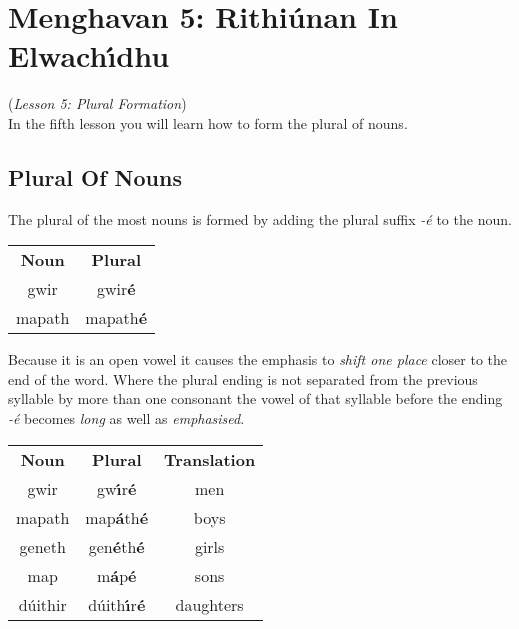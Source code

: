 \section{Menghavan 5: Rithi\'{u}nan In Elwach\'{\i}dhu}
(\textit{Lesson 5: Plural Formation})\\

In the fifth lesson you will learn how to form the plural of nouns.\\

\subsection{Plural Of Nouns}

The plural of the most nouns is formed by adding the plural suffix \textit{-\'{e}} to the noun.
\begin{table}[H]
\centering
\begin{tabular}{cc}
  \toprule
  \textbf{Noun} & \textbf{Plural}\\
  \cmidrule(lr){1-1}\cmidrule(lr){2-2}
  gwir & gwir\textbf{\'{e}}\\
  mapath & mapath\textbf{\'{e}}\\
  \bottomrule
\end{tabular}
\label{example_noun_plural}
\end{table}

Because it is an open vowel it causes the emphasis to \textit{shift one place} closer to the end of the word. Where the plural ending is not separated from the previous syllable by more than one consonant the vowel of that syllable before the ending \textit{-\'{e}} becomes \textit{long} as well as \textit{emphasised}.
\begin{table}[H]
\centering
\begin{tabular}{ccc}
  \toprule
  \textbf{Noun} & \textbf{Plural} & \textbf{Translation}\\
  \cmidrule(lr){1-1}\cmidrule(lr){2-2}\cmidrule(lr){3-3}
  gwir & gw\textbf{\'{\i}}r\textbf{\'{e}} & men\\
  mapath & map\textbf{\'{a}}th\textbf{\'{e}} & boys\\
  geneth & gen\textbf{\'{e}}th\textbf{\'{e}} & girls\\
  map & m\textbf{\'{a}}p\textbf{\'{e}} & sons\\
  d\'{u}ithir & d\'{u}ith\textbf{\'{\i}}r\textbf{\'{e}} & daughters\\
  \bottomrule
\end{tabular}
\label{example_emphasis_shift}
\end{table}

